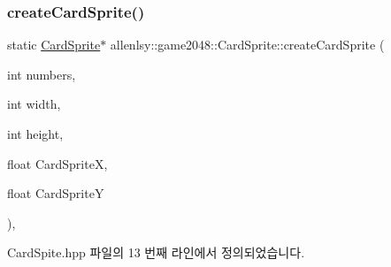 \mbox{\label{classallenlsy_1_1game2048_1_1_card_sprite_a3a14745470040dfb933397ccb83344d7}} 
\subsubsection{\texorpdfstring{create\+Card\+Sprite()}{createCardSprite()}}
{\footnotesize\ttfamily static \hyperlink{classallenlsy_1_1game2048_1_1_card_sprite}{Card\+Sprite}$\ast$ allenlsy\+::game2048\+::\+Card\+Sprite\+::create\+Card\+Sprite (\begin{DoxyParamCaption}\item[{int}]{numbers,  }\item[{int}]{width,  }\item[{int}]{height,  }\item[{float}]{Card\+SpriteX,  }\item[{float}]{Card\+SpriteY }\end{DoxyParamCaption})\hspace{0.3cm}{\ttfamily [inline]}, {\ttfamily [static]}}



Card\+Spite.\+hpp 파일의 13 번째 라인에서 정의되었습니다.


